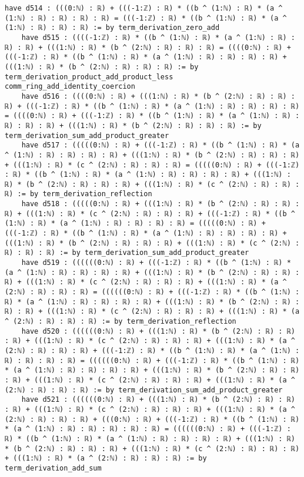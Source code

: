 \documentclass{article}
\begin{document}
\begin{tcolorbox}[colback=white!10, width=\linewidth]
\begin{lstlisting}[language=Lean4]
    have d514 : (((0:ℕ) : ℝ) + (((-1:ℤ) : ℝ) * ((b ^ (1:ℕ) : ℝ) * (a ^ (1:ℕ) : ℝ) : ℝ) : ℝ) : ℝ) = (((-1:ℤ) : ℝ) * ((b ^ (1:ℕ) : ℝ) * (a ^ (1:ℕ) : ℝ) : ℝ) : ℝ) := by term_derivation_zero_add
    have d515 : ((((-1:ℤ) : ℝ) * ((b ^ (1:ℕ) : ℝ) * (a ^ (1:ℕ) : ℝ) : ℝ) : ℝ) + (((1:ℕ) : ℝ) * (b ^ (2:ℕ) : ℝ) : ℝ) : ℝ) = ((((0:ℕ) : ℝ) + (((-1:ℤ) : ℝ) * ((b ^ (1:ℕ) : ℝ) * (a ^ (1:ℕ) : ℝ) : ℝ) : ℝ) : ℝ) + (((1:ℕ) : ℝ) * (b ^ (2:ℕ) : ℝ) : ℝ) : ℝ) := by term_derivation_product_add_product_less comm_ring_add_identity_coercion
    have d516 : ((((0:ℕ) : ℝ) + (((1:ℕ) : ℝ) * (b ^ (2:ℕ) : ℝ) : ℝ) : ℝ) + (((-1:ℤ) : ℝ) * ((b ^ (1:ℕ) : ℝ) * (a ^ (1:ℕ) : ℝ) : ℝ) : ℝ) : ℝ) = ((((0:ℕ) : ℝ) + (((-1:ℤ) : ℝ) * ((b ^ (1:ℕ) : ℝ) * (a ^ (1:ℕ) : ℝ) : ℝ) : ℝ) : ℝ) + (((1:ℕ) : ℝ) * (b ^ (2:ℕ) : ℝ) : ℝ) : ℝ) := by term_derivation_sum_add_product_greater
    have d517 : (((((0:ℕ) : ℝ) + (((-1:ℤ) : ℝ) * ((b ^ (1:ℕ) : ℝ) * (a ^ (1:ℕ) : ℝ) : ℝ) : ℝ) : ℝ) + (((1:ℕ) : ℝ) * (b ^ (2:ℕ) : ℝ) : ℝ) : ℝ) + (((1:ℕ) : ℝ) * (c ^ (2:ℕ) : ℝ) : ℝ) : ℝ) = (((((0:ℕ) : ℝ) + (((-1:ℤ) : ℝ) * ((b ^ (1:ℕ) : ℝ) * (a ^ (1:ℕ) : ℝ) : ℝ) : ℝ) : ℝ) + (((1:ℕ) : ℝ) * (b ^ (2:ℕ) : ℝ) : ℝ) : ℝ) + (((1:ℕ) : ℝ) * (c ^ (2:ℕ) : ℝ) : ℝ) : ℝ) := by term_derivation_reflection
    have d518 : (((((0:ℕ) : ℝ) + (((1:ℕ) : ℝ) * (b ^ (2:ℕ) : ℝ) : ℝ) : ℝ) + (((1:ℕ) : ℝ) * (c ^ (2:ℕ) : ℝ) : ℝ) : ℝ) + (((-1:ℤ) : ℝ) * ((b ^ (1:ℕ) : ℝ) * (a ^ (1:ℕ) : ℝ) : ℝ) : ℝ) : ℝ) = (((((0:ℕ) : ℝ) + (((-1:ℤ) : ℝ) * ((b ^ (1:ℕ) : ℝ) * (a ^ (1:ℕ) : ℝ) : ℝ) : ℝ) : ℝ) + (((1:ℕ) : ℝ) * (b ^ (2:ℕ) : ℝ) : ℝ) : ℝ) + (((1:ℕ) : ℝ) * (c ^ (2:ℕ) : ℝ) : ℝ) : ℝ) := by term_derivation_sum_add_product_greater
    have d519 : ((((((0:ℕ) : ℝ) + (((-1:ℤ) : ℝ) * ((b ^ (1:ℕ) : ℝ) * (a ^ (1:ℕ) : ℝ) : ℝ) : ℝ) : ℝ) + (((1:ℕ) : ℝ) * (b ^ (2:ℕ) : ℝ) : ℝ) : ℝ) + (((1:ℕ) : ℝ) * (c ^ (2:ℕ) : ℝ) : ℝ) : ℝ) + (((1:ℕ) : ℝ) * (a ^ (2:ℕ) : ℝ) : ℝ) : ℝ) = ((((((0:ℕ) : ℝ) + (((-1:ℤ) : ℝ) * ((b ^ (1:ℕ) : ℝ) * (a ^ (1:ℕ) : ℝ) : ℝ) : ℝ) : ℝ) + (((1:ℕ) : ℝ) * (b ^ (2:ℕ) : ℝ) : ℝ) : ℝ) + (((1:ℕ) : ℝ) * (c ^ (2:ℕ) : ℝ) : ℝ) : ℝ) + (((1:ℕ) : ℝ) * (a ^ (2:ℕ) : ℝ) : ℝ) : ℝ) := by term_derivation_reflection
    have d520 : ((((((0:ℕ) : ℝ) + (((1:ℕ) : ℝ) * (b ^ (2:ℕ) : ℝ) : ℝ) : ℝ) + (((1:ℕ) : ℝ) * (c ^ (2:ℕ) : ℝ) : ℝ) : ℝ) + (((1:ℕ) : ℝ) * (a ^ (2:ℕ) : ℝ) : ℝ) : ℝ) + (((-1:ℤ) : ℝ) * ((b ^ (1:ℕ) : ℝ) * (a ^ (1:ℕ) : ℝ) : ℝ) : ℝ) : ℝ) = ((((((0:ℕ) : ℝ) + (((-1:ℤ) : ℝ) * ((b ^ (1:ℕ) : ℝ) * (a ^ (1:ℕ) : ℝ) : ℝ) : ℝ) : ℝ) + (((1:ℕ) : ℝ) * (b ^ (2:ℕ) : ℝ) : ℝ) : ℝ) + (((1:ℕ) : ℝ) * (c ^ (2:ℕ) : ℝ) : ℝ) : ℝ) + (((1:ℕ) : ℝ) * (a ^ (2:ℕ) : ℝ) : ℝ) : ℝ) := by term_derivation_sum_add_product_greater
    have d521 : ((((((0:ℕ) : ℝ) + (((1:ℕ) : ℝ) * (b ^ (2:ℕ) : ℝ) : ℝ) : ℝ) + (((1:ℕ) : ℝ) * (c ^ (2:ℕ) : ℝ) : ℝ) : ℝ) + (((1:ℕ) : ℝ) * (a ^ (2:ℕ) : ℝ) : ℝ) : ℝ) + (((0:ℕ) : ℝ) + (((-1:ℤ) : ℝ) * ((b ^ (1:ℕ) : ℝ) * (a ^ (1:ℕ) : ℝ) : ℝ) : ℝ) : ℝ) : ℝ) = ((((((0:ℕ) : ℝ) + (((-1:ℤ) : ℝ) * ((b ^ (1:ℕ) : ℝ) * (a ^ (1:ℕ) : ℝ) : ℝ) : ℝ) : ℝ) + (((1:ℕ) : ℝ) * (b ^ (2:ℕ) : ℝ) : ℝ) : ℝ) + (((1:ℕ) : ℝ) * (c ^ (2:ℕ) : ℝ) : ℝ) : ℝ) + (((1:ℕ) : ℝ) * (a ^ (2:ℕ) : ℝ) : ℝ) : ℝ) := by term_derivation_add_sum

\end{lstlisting}
\end{tcolorbox}
\end{document}
